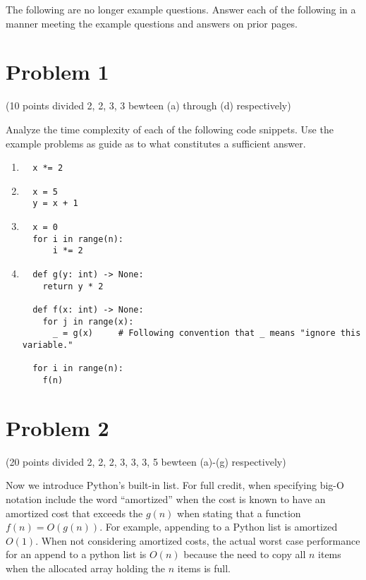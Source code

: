 \documentclass{article}
\begin{document}
\newpage

The following are no longer example questions.  Answer each of the following
in a manner meeting the example questions and answers on prior pages.



\section{Problem 1}

(10 points divided 2, 2, 3, 3 bewteen (a) through (d) respectively)

Analyze the time complexity of each of the following code snippets.
Use the example problems as guide as to what constitutes a sufficient answer.

\begin{enumerate}[label=(\alph*)]

\item
\begin{verbatim}
  x *= 2
\end{verbatim}
  
\item
\begin{verbatim}
  x = 5
  y = x + 1
\end{verbatim}

\item
\begin{verbatim}
  x = 0
  for i in range(n):
      i *= 2
\end{verbatim}

\item
\begin{verbatim}
  def g(y: int) -> None:
    return y * 2

  def f(x: int) -> None:
    for j in range(x):
      _ = g(x)     # Following convention that _ means "ignore this variable."

  for i in range(n):
    f(n)
\end{verbatim}
\end{enumerate}

\section{Problem 2}

(20 points divided 2, 2, 2, 3, 3, 3, 5 bewteen (a)-(g) respectively)

Now we introduce Python's built-in list.  For full credit, when
specifying big-O notation include the word ``amortized'' when the cost
is known to have an amortized cost that exceeds the $g(n)$ when
stating that a function $f(n) = O(g(n))$.  For example, appending to a
Python list is amortized $O(1)$.  When not considering amortized
costs, the actual worst case performance for an append to a python
list is $O(n)$ because the need to copy all $n$ items when the
allocated array holding the $n$ items is full.
\end{document}

